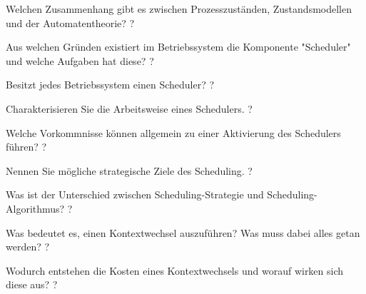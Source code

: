 \documentclass[avery5371]{flashcards}
\begin{document}
\begin{flashcard}{Welchen Zusammenhang gibt es zwischen Prozesszuständen, Zustandsmodellen und der Automatentheorie?}
    ?
\end{flashcard}

\begin{flashcard}[Scheduler]{Aus welchen Gründen existiert im Betriebssystem die Komponente "Scheduler" und welche Aufgaben hat diese?}
    ?
\end{flashcard}

\begin{flashcard}[Scheduler]{Besitzt jedes Betriebssystem einen Scheduler?}
    ?
\end{flashcard}

\begin{flashcard}[Scheduler]{Charakterisieren Sie die Arbeitsweise eines Schedulers.}
    ?
\end{flashcard}

\begin{flashcard}[Scheduler]{Welche Vorkommnisse können allgemein zu einer Aktivierung des Schedulers führen?}
    ?
\end{flashcard}

\begin{flashcard}{Nennen Sie mögliche strategische Ziele des Scheduling.}
    ?
\end{flashcard}

\begin{flashcard}{Was ist der Unterschied zwischen Scheduling-Strategie und Scheduling-Algorithmus?}
    ?
\end{flashcard}

\begin{flashcard}[Kontextwechsel]{Was bedeutet es, einen Kontextwechsel auszuführen? Was muss dabei alles getan werden?}
    ?
\end{flashcard}

\begin{flashcard}[Kontextwechsel]{Wodurch entstehen die Kosten eines Kontextwechsels und worauf wirken sich diese aus?}
    ?
\end{flashcard}
\end{document}
